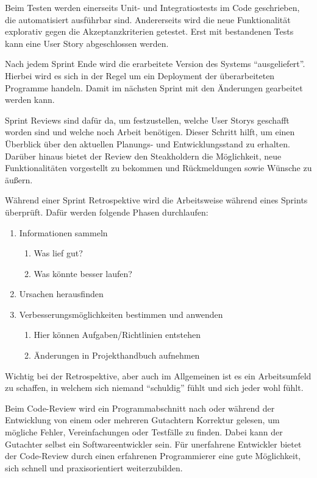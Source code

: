 Beim Testen werden einerseits Unit- und Integratiostests im Code geschrieben, die automatisiert ausführbar sind.
Andererseits wird die neue Funktionalität explorativ gegen die Akzeptanzkriterien getestet.
Erst mit bestandenen Tests kann eine User Story abgeschlossen werden.

Nach jedem Sprint Ende wird die erarbeitete Version des Systems "`ausgeliefert"'.
Hierbei wird es sich in der Regel um ein Deployment der überarbeiteten Programme handeln.
Damit im nächsten Sprint mit den Änderungen gearbeitet werden kann.

Sprint Reviews sind dafür da, um festzustellen, welche User Storys geschafft worden sind und welche noch Arbeit benötigen.
Dieser Schritt hilft, um einen Überblick über den aktuellen Planungs- und Entwicklungsstand zu erhalten.
Darüber hinaus bietet der Review den Steakholdern die Möglichkeit, neue Funktionalitäten vorgestellt zu bekommen und Rückmeldungen sowie Wünsche zu äußern.

Während einer Sprint Retrospektive wird die Arbeitsweise während eines Sprints überprüft.
Dafür werden folgende Phasen durchlaufen:
\begin{enumerate}
	\item Informationen sammeln
	\begin{enumerate}
		\item Was lief gut?
		\item Was könnte besser laufen?
	\end{enumerate}
	\item Ursachen herausfinden
	\item Verbesserungsmöglichkeiten bestimmen und anwenden
	\begin{enumerate}
		\item Hier können Aufgaben/Richtlinien entstehen
		\item Änderungen in Projekthandbuch aufnehmen
	\end{enumerate}
\end{enumerate}
Wichtig bei der Retrospektive, aber auch im Allgemeinen ist es ein Arbeitsumfeld zu schaffen, in welchem sich niemand "`schuldig"' fühlt und sich jeder wohl fühlt.

Beim Code-Review wird ein Programmabschnitt nach oder während der Entwicklung von einem oder mehreren Gutachtern Korrektur gelesen, um mögliche Fehler, Vereinfachungen oder Testfälle zu finden.
Dabei kann der Gutachter selbst ein Softwareentwickler sein.
Für unerfahrene Entwickler bietet der Code-Review durch einen erfahrenen Programmierer eine gute Möglichkeit, sich schnell und praxisorientiert weiterzubilden.\cite{wiki:codereview}
